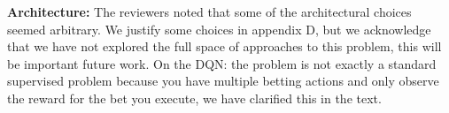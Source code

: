 \documentclass{article}
\begin{document}
\textbf{Architecture:} The reviewers noted that some of the architectural choices seemed arbitrary. We justify some choices in appendix D, but we acknowledge that we have not explored the full space of approaches to this problem, this will be important future work. On the DQN: the problem is not exactly a standard supervised problem because you have multiple betting actions and only observe the reward for the bet you execute, we have clarified this in the text. \par 
\end{document}
